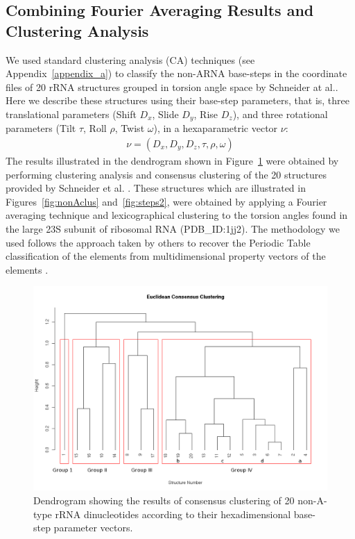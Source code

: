 \subsection{Combining Fourier Averaging Results and Clustering Analysis}
We   used   standard   clustering   analysis  (CA)   techniques   (see
Appendix~\ref{appendix_a}) to classify  the non-ARNA base-steps in the
coordinate files of 20 rRNA  structures grouped in torsion angle space
by  Schneider  at  al.\cite{schneider2004}.  Here  we  describe  these
structures using their base-step parameters, that is, three
translational parameters  (Shift $D_x$, Slide $D_y$,  Rise $D_z$), and
three   rotational  parameters  (Tilt   $\tau$,  Roll   $\rho$,  Twist
$\omega$), in a hexaparametric vector $\nu$:
\begin{gather}
\nu = (D_x, D_y, D_z, \tau, \rho, \omega)
\end{gather}
The    results    illustrated    in    the   dendrogram    shown    in
Figure~\ref{fig:eucl_cons}  were  obtained  by  performing  clustering
analysis  and consensus clustering  of the  20 structures  provided by
Schneider  et al.   \cite{schneider2004}. These  structures  which are
illustrated  in Figures~\ref{fig:nonAclus}  and~\ref{fig:steps2}, were
obtained by applying a Fourier averaging technique and lexicographical
clustering to  the torsion  angles found in  the large 23S  subunit of
ribosomal  RNA (PDB\_ID:1jj2).   The methodology  we used  follows the
approach taken by others  to recover the Periodic Table classification
of the elements from multidimensional property vectors of the elements
\cite{restrepo2004, restrepo2006}.
\begin{figure}[htbp]
 \centering
\includegraphics[angle=90, scale=0.5]{Chapter2/eucli_cons_nonA-RNA.png}
\caption{Dendrogram showing the results  of consensus clustering of 20
non-A-type  rRNA  dinucleotides   according  to  their  hexadimensional
base-step parameter vectors.}
 \label{fig:eucl_cons}
\end{figure}

